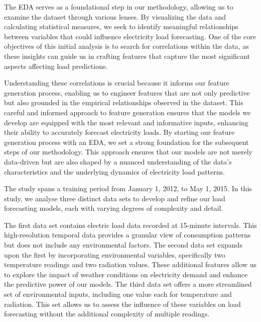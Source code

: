 \documentclass{article} %
\begin{document}
The \gls{EDA} serves as a foundational step in our methodology, allowing us to examine the dataset through various lenses. By visualizing the data and calculating statistical measures, we seek to identify meaningful relationships between variables that could influence electricity load forecasting. One of the core objectives of this initial analysis is to search for correlations within the data, as these insights can guide us in crafting features that capture the most significant aspects affecting load predictions. 

Understanding these correlations is crucial because it informs our feature generation process, enabling us to engineer features that are not only predictive but also grounded in the empirical relationships observed in the dataset. This careful and informed approach to feature generation ensures that the models we develop are equipped with the most relevant and informative inputs, enhancing their ability to accurately forecast electricity loads. By starting our feature generation process with an \gls{EDA}, we set a strong foundation for the subsequent steps of our methodology. This approach ensures that our models are not merely data-driven but are also shaped by a nuanced understanding of the data's characteristics and the underlying dynamics of electricity load patterns. 

The study spans a training period from January 1, 2012, to May 1, 2015. In this study, we analyse three distinct data sets to develop and refine our load forecasting models, each with varying degrees of complexity and detail. 

The first data set contains electric load data recorded at 15-minute intervals. This high-resolution temporal data provides a granular view of consumption patterns but does not include any environmental factors. The second data set expands upon the first by incorporating environmental variables, specifically two temperature readings and two radiation values. These additional features allow us to explore the impact of weather conditions on electricity demand and enhance the predictive power of our models. The third data set offers a more streamlined set of environmental inputs, including one value each for temperature and radiation. This set allows us to assess the influence of these variables on load forecasting without the additional complexity of multiple readings. 
\end{document}
